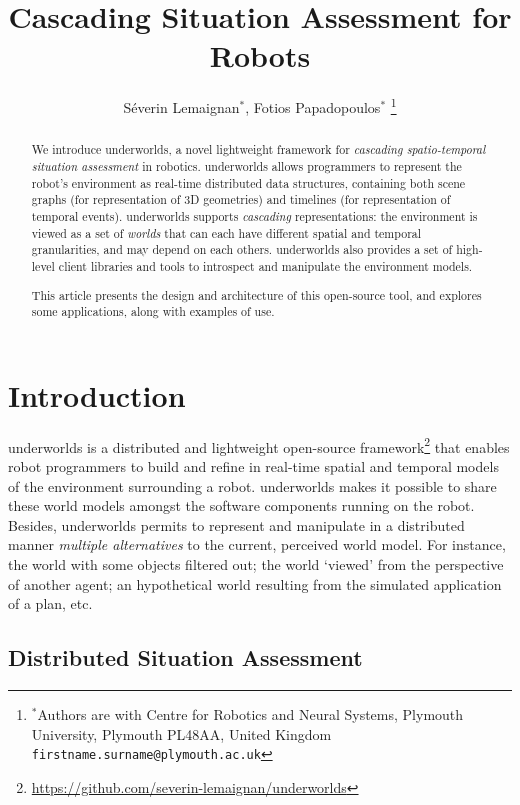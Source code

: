\documentclass[letterpaper, 10 pt, conference]{ieeeconf}  %
\title{\LARGE \bf
Cascading Situation Assessment for Robots
}
\author{Séverin Lemaignan$^{*}$, Fotios Papadopoulos$^{*}$%
\thanks{$^{*}$Authors are with Centre for Robotics and Neural Systems,
        Plymouth University, Plymouth PL48AA, United Kingdom
        {\tt\small firstname.surname@plymouth.ac.uk}}%
}
\newcommand{\uwds}{{\sc underworlds}\xspace}
\begin{document}
\maketitle
\thispagestyle{empty}
\pagestyle{empty}


\begin{abstract}

    We introduce \uwds, a novel lightweight framework for \emph{cascading
    spatio-temporal situation assessment} in robotics. \uwds allows programmers
    to represent the robot's environment as real-time distributed data
    structures, containing both scene graphs (for representation of 3D
    geometries) and timelines (for representation of temporal events). \uwds
    supports \emph{cascading} representations: the environment is viewed as a
    set of \emph{worlds} that can each have different spatial and temporal
    granularities, and may depend on each others.  \uwds also provides a set of
    high-level client libraries and tools to introspect and manipulate the
    environment models.

    This article presents the design and architecture of this open-source tool,
    and explores some applications, along with examples of use.

\end{abstract}


\section{Introduction}


\uwds is a distributed and lightweight open-source
framework\footnote{\url{https://github.com/severin-lemaignan/underworlds}} that
enables robot programmers to build and refine in real-time spatial and temporal
models of the environment surrounding a robot. \uwds makes it possible to share
these world models amongst the software components running on the robot.
Besides, \uwds permits to represent and manipulate in a distributed manner
\emph{multiple alternatives} to the current, perceived world model. For
instance, the world with some objects filtered out; the world `viewed' from the
perspective of another agent; an hypothetical world resulting from the simulated
application of a plan, etc.


\subsection{Distributed Situation Assessment}
\end{document}
